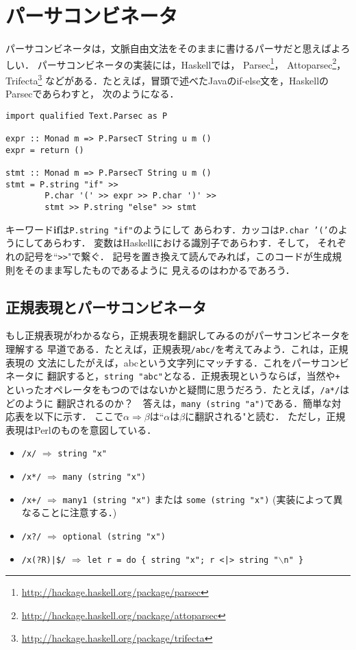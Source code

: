 \documentclass{jarticle}
\begin{document}
\section{パーサコンビネータ}

パーサコンビネータは，文脈自由文法をそのままに書けるパーサだと思えばよろしい．
パーサコンビネータの実装には，Haskellでは，
Parsec\footnote{\url{http://hackage.haskell.org/package/parsec}}，
Attoparsec\footnote{\url{http://hackage.haskell.org/package/attoparsec}}，
Trifecta\footnote{\url{http://hackage.haskell.org/package/trifecta}}
などがある．たとえば，冒頭で述べたJavaのif-else文を，HaskellのParsecであらわすと，
次のようになる．
\lstset{basicstyle=\ttfamily,}
\begin{lstlisting}
import qualified Text.Parsec as P

expr :: Monad m => P.ParsecT String u m ()
expr = return ()

stmt :: Monad m => P.ParsecT String u m ()
stmt = P.string "if" >>
        P.char '(' >> expr >> P.char ')' >>
        stmt >> P.string "else" >> stmt
\end{lstlisting}
キーワード{\bf if}は{\tt P.string "if"}のようにして
あらわす．カッコは{\tt P.char '('}のようにしてあらわす．
変数はHaskellにおける識別子であらわす．そして，
それぞれの記号を``\verb|>|\verb|>|"で繋ぐ．
記号を置き換えて読んでみれば，このコードが生成規則をそのまま写したものであるように
見えるのはわかるであろう．

\subsection{正規表現とパーサコンビネータ}

もし正規表現がわかるなら，正規表現を翻訳してみるのがパーサコンビネータを理解する
早道である．たとえば，正規表現{\tt /abc/}を考えてみよう．これは，正規表現の
文法にしたがえば，abcという文字列にマッチする．これをパーサコンビネータに
翻訳すると，{\tt string "abc"}となる．正規表現というならば，当然{\tt *}や{\tt +}
といったオペレータをもつのではないかと疑問に思うだろう．たとえば，{\tt /a*/}はどのように
翻訳されるのか？　答えは，{\tt many (string "a")}である．簡単な対応表を以下に示す．
ここで$\alpha \Longrightarrow \beta$は``$\alpha$は$\beta$に翻訳される"と読む．
ただし，正規表現はPerlのものを意図している．

\begin{itemize}
\item {\tt /x/} $\Longrightarrow$ {\tt string "x"}
\item {\tt /x*/} $\Longrightarrow$ {\tt many (string "x")}
\item {\tt /x+/} $\Longrightarrow$ {\tt many1 (string "x")} または {\tt some (string "x")} (実装によって異なることに注意する．)
\item {\tt /x?/} $\Longrightarrow$ {\tt optional (string "x")}
\item {\tt /x(?R)|\$/} $\Longrightarrow$ {\tt let r = do \{ string "x"; r \verb|<|\verb|||\verb|>| string "$\backslash$n" \}}
\end{itemize}
\end{document}
